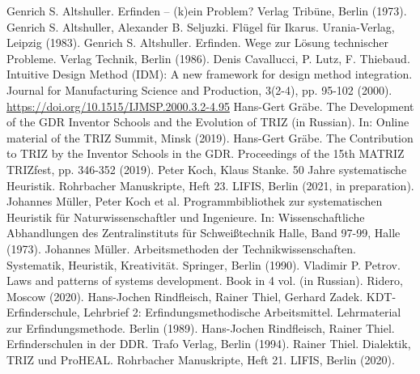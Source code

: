 \documentclass[11pt,a4paper]{article}
\begin{document}
\begin{thebibliography}{xxx}
 Genrich S. Altshuller. Erfinden – (k)ein Problem?
  Verlag Tribüne, Berlin (1973).
  Genrich S. Altshuller, Alexander B. Seljuzki. Flügel
  für Ikarus. Urania-Verlag, Leipzig (1983).
 Genrich S. Altshuller. Erfinden. Wege zur Lösung
  technischer Probleme. Verlag Technik, Berlin (1986). 
 Denis Cavallucci, P. Lutz, F. Thiebaud. Intuitive
  Design Method (IDM): A new framework for design method integration. Journal
  for Manufacturing Science and Production, 3(2-4), pp. 95-102 (2000).
  \url{https://doi.org/10.1515/IJMSP.2000.3.2-4.95}
 Hans-Gert Gräbe. The Development of the GDR Inventor
  Schools and the Evolution of TRIZ (in Russian). In: Online material of the
  TRIZ Summit, Minsk (2019).
 Hans-Gert Gräbe. The Contribution to TRIZ by the
  Inventor Schools in the GDR. Proceedings of the 15th MATRIZ TRIZfest, pp.
  346-352 (2019).
 Peter Koch, Klaus Stanke. 50 Jahre systematische Heuristik.
  Rohrbacher Manuskripte, Heft 23. LIFIS, Berlin (2021, in preparation).
 Johannes Müller, Peter Koch et al. Programmbibliothek
  zur systematischen Heuristik für Naturwissenschaftler und Ingenieure. In:
  Wissenschaftliche Abhandlungen des Zentralinstituts für Schweißtechnik
  Halle, Band 97-99, Halle (1973).
 Johannes Müller. Arbeitsmethoden der
  Technikwissenschaften.  Systematik, Heuristik, Kreativität. Springer, Berlin
  (1990).
 Vladimir P. Petrov. Laws and patterns of systems
  development. Book in 4 vol. (in Russian).  Ridero, Moscow (2020).
 Hans-Jochen Rindfleisch, Rainer Thiel, Gerhard Zadek.
  KDT-Erfinderschule, Lehrbrief 2: Erfindungs­methodische Arbeitsmittel.
  Lehrmaterial zur Erfindungsmethode. Berlin (1989).
 Hans-Jochen Rindfleisch, Rainer Thiel. Erfinderschulen in der
  DDR. Trafo Verlag, Berlin (1994).
  Rainer Thiel.  Dialektik, TRIZ und ProHEAL. Rohrbacher
   Manuskripte, Heft 21. LIFIS, Berlin (2020).
\end{thebibliography}
\end{document}
